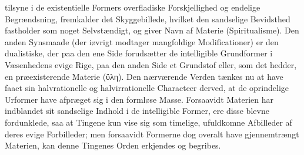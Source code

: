 \documentclass[12pt]{book}
\newcommand{\dsi}{\textup{ɔ:}}
\begin{document}
tilsyne i de existentielle Formers overfladiske Forskjellighed og endelige Begrændsning,
fremkalder det Skyggebillede, hvilket den sandselige Bevidsthed fastholder som noget
Selvstændigt, og giver Navn af Materie (Spiritualisme). Den anden Synsmaade (der iøvrigt
modtager mangfoldige Modificationer) er den dualistiske, der paa den ene Side forudsætter de
intelligible Grundformer i Væsenhedens evige Rige, paa den anden Side et Grundstof eller, som
det hedder, en præexisterende Materie (ὕλη). Den nærværende Verden tænkes nu at have faaet sin
halvrationelle og halvirrationelle Characteer derved, at de oprindelige Urformer have afpræget
sig i den formløse Masse. Forsaavidt Materien har indblandet sit sandselige Indhold i de
intelligible Former, ere disse blevne fordunklede, saa at Tingene kun vise sig som timelige,
ufuldkomne Afbilleder af deres evige Forbilleder; men forsaavidt Formerne dog overalt have
gjennemtrængt Materien, kan denne Tingenes Orden erkjendes og begribes.
\end{document}
